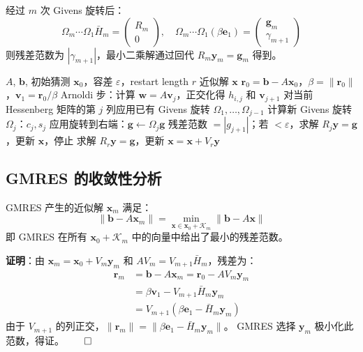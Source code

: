 经过 $m$ 次 Givens 旋转后：
\begin{equation}
  \Omega_m \cdots \Omega_1 \bar{H}_m = \begin{pmatrix} R_m \\ 0 \end{pmatrix}, \quad
  \Omega_m \cdots \Omega_1 (\beta \mathbf{e}_1) = \begin{pmatrix} \mathbf{g}_m \\ \gamma_{m+1} \end{pmatrix}
\end{equation}
则残差范数为 $|\gamma_{m+1}|$，最小二乘解通过回代 $R_m \mathbf{y}_m = \mathbf{g}_m$ 得到。

\begin{algorithm}
\caption{GMRES 算法\cite{SaadSchultz1986, Niu2009}}
\begin{algorithmic}[1]
\REQUIRE $A$, $\mathbf{b}$, 初始猜测 $\mathbf{x}_0$，容差 $\varepsilon$，restart length $r$
\ENSURE 近似解 $\mathbf{x}$
\STATE $\mathbf{r}_0 = \mathbf{b} - A\mathbf{x}_0$，$\beta = \|\mathbf{r}_0\|$，$\mathbf{v}_1 = \mathbf{r}_0 / \beta$
    \STATE Arnoldi 步：计算 $\mathbf{w} = A\mathbf{v}_j$，正交化得 $h_{i,j}$ 和 $\mathbf{v}_{j+1}$
    \STATE 对当前 Hessenberg 矩阵的第 $j$ 列应用已有 Givens 旋转 $\Omega_1, \ldots, \Omega_{j-1}$
    \STATE 计算新 Givens 旋转 $\Omega_j$：$c_j, s_j$
    \STATE 应用旋转到右端：$\mathbf{g} \leftarrow \Omega_j \mathbf{g}$
    \STATE 残差范数 $= |g_{j+1}|$；若 $< \varepsilon$，求解 $R_j \mathbf{y} = \mathbf{g}$，更新 $\mathbf{x}$，停止
  \ENDFOR
  \STATE 求解 $R_r \mathbf{y} = \mathbf{g}$，更新 $\mathbf{x} = \mathbf{x} + V_r \mathbf{y}$
\ENDFOR
\end{algorithmic}
\end{algorithm}

\subsection{GMRES 的收敛性分析}

\begin{theorem}
  \label{thm:gmres_optimality}
  GMRES 产生的近似解 $\mathbf{x}_m$ 满足：
  \begin{equation}
    \|\mathbf{b} - A\mathbf{x}_m\| = \min_{\mathbf{x} \in \mathbf{x}_0 + \mathcal{K}_m}
    \|\mathbf{b} - A\mathbf{x}\|
  \end{equation}
  即 GMRES 在所有 $\mathbf{x}_0 + \mathcal{K}_m$ 中的向量中给出了最小的残差范数。

  \textbf{证明}：由 $\mathbf{x}_m = \mathbf{x}_0 + V_m\mathbf{y}_m$ 和
  $AV_m = V_{m+1}\bar{H}_m$，残差为：
  \begin{align}
    \mathbf{r}_m &= \mathbf{b} - A\mathbf{x}_m = \mathbf{r}_0 - AV_m\mathbf{y}_m \\
    &= \beta\mathbf{v}_1 - V_{m+1}\bar{H}_m\mathbf{y}_m \\
    &= V_{m+1}(\beta\mathbf{e}_1 - \bar{H}_m\mathbf{y}_m)
  \end{align}
  由于 $V_{m+1}$ 的列正交，$\|\mathbf{r}_m\| = \|\beta\mathbf{e}_1 - \bar{H}_m\mathbf{y}_m\|$。
  GMRES 选择 $\mathbf{y}_m$ 极小化此范数，得证。$\qed$
\end{theorem}

